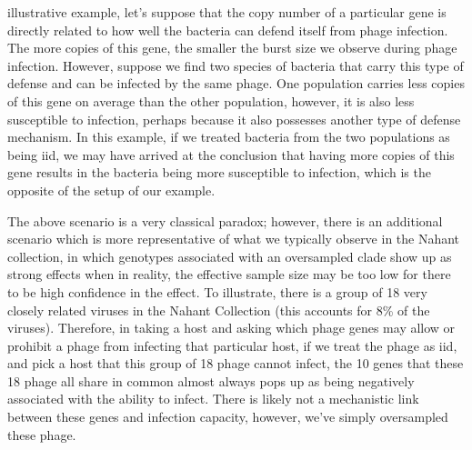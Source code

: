\documentclass[12pt,twoside]{mitthesis-manusdown}
\begin{document}
illustrative example, let's suppose that the copy number of a particular
gene is directly related to how well the bacteria can defend itself from
phage infection. The more copies of this gene, the smaller the burst
size we observe during phage infection. However, suppose we find two
species of bacteria that carry this type of defense and can be infected
by the same phage. One population carries less copies of this gene on
average than the other population, however, it is also less susceptible
to infection, perhaps because it also possesses another type of defense
mechanism. In this example, if we treated bacteria from the two
populations as being iid, we may have arrived at the conclusion that
having more copies of this gene results in the bacteria being more
susceptible to infection, which is the opposite of the setup of our
example.

The above scenario is a very classical paradox; however, there is an
additional scenario which is more representative of what we typically
observe in the Nahant collection, in which genotypes associated with an
oversampled clade show up as strong effects when in reality, the
effective sample size may be too low for there to be high confidence in
the effect. To illustrate, there is a group of 18 very closely related
viruses in the Nahant Collection (this accounts for 8\% of the viruses).
Therefore, in taking a host and asking which phage genes may allow or
prohibit a phage from infecting that particular host, if we treat the
phage as iid, and pick a host that this group of 18 phage cannot infect,
the 10 genes that these 18 phage all share in common almost always pops
up as being negatively associated with the ability to infect. There is
likely not a mechanistic link between these genes and infection
capacity, however, we've simply oversampled these phage.
\end{document}
